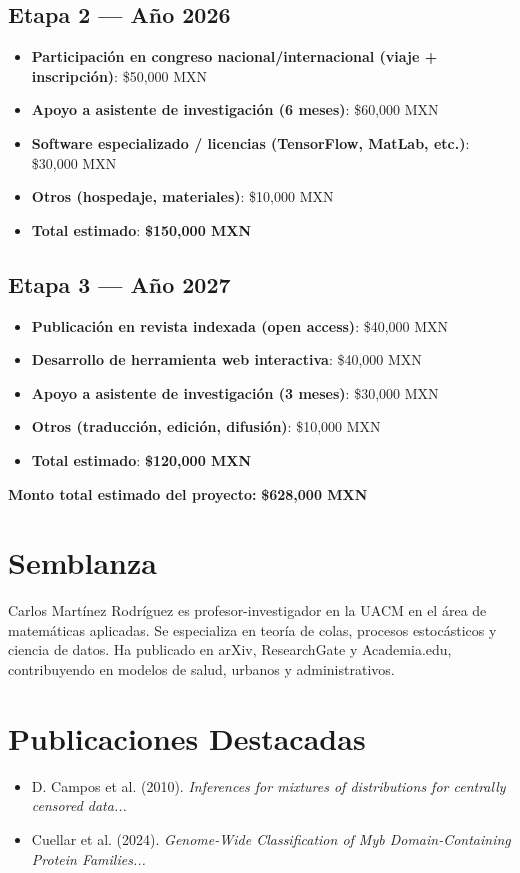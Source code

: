 \documentclass[12pt]{article}
\begin{document}
\subsection*{Etapa 2 — Año 2026}
\begin{itemize}
  \item \textbf{Participación en congreso nacional/internacional (viaje + inscripción)}: \$50,000 MXN
  \item \textbf{Apoyo a asistente de investigación (6 meses)}: \$60,000 MXN
  \item \textbf{Software especializado / licencias (TensorFlow, MatLab, etc.)}: \$30,000 MXN
  \item \textbf{Otros (hospedaje, materiales)}: \$10,000 MXN
  \item \textbf{Total estimado}: \textbf{\$150,000 MXN}
\end{itemize}

\subsection*{Etapa 3 — Año 2027}
\begin{itemize}
  \item \textbf{Publicación en revista indexada (open access)}: \$40,000 MXN
  \item \textbf{Desarrollo de herramienta web interactiva}: \$40,000 MXN
  \item \textbf{Apoyo a asistente de investigación (3 meses)}: \$30,000 MXN
  \item \textbf{Otros (traducción, edición, difusión)}: \$10,000 MXN
  \item \textbf{Total estimado}: \textbf{\$120,000 MXN}
\end{itemize}

\noindent\textbf{Monto total estimado del proyecto:} \textbf{\$628,000 MXN}

\section{Semblanza}
Carlos Martínez Rodríguez es profesor-investigador en la UACM en el área de matemáticas aplicadas. Se especializa en teoría de colas, procesos estocásticos y ciencia de datos. Ha publicado en arXiv, ResearchGate y Academia.edu, contribuyendo en modelos de salud, urbanos y administrativos.

\section{Publicaciones Destacadas}
\begin{itemize}
  \item D. Campos et al. (2010). \textit{Inferences for mixtures of distributions for centrally censored data...}
  \item Cuellar et al. (2024). \textit{Genome-Wide Classification of Myb Domain-Containing Protein Families...}
\end{itemize}
\end{document}
